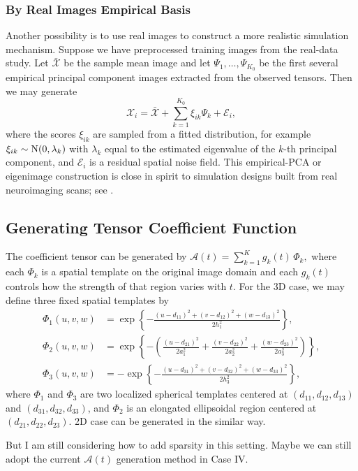 \documentclass[10pt]{notes}
\begin{document}
\subsubsection{By Real Images Empirical Basis}

Another possibility is to use real images to construct a more realistic
simulation mechanism. Suppose we have preprocessed training images from the
real-data study. Let $\bar{\mathcal{X}}$ be the sample mean image and let
$\Psi_1,\dots,\Psi_{K_0}$ be the first several empirical principal component
images extracted from the observed tensors. Then we may generate
\[
\mathcal{X}_i
=
\bar{\mathcal{X}}
+ \sum_{k=1}^{K_0} \xi_{ik}\Psi_k
+ \mathcal{E}_i,
\]
where the scores $\xi_{ik}$ are sampled from a fitted distribution, for
example $\xi_{ik}\sim \mathrm{N}(0,\lambda_k)$ with $\lambda_k$ equal to the
estimated eigenvalue of the $k$-th principal component, and
$\mathcal{E}_i$ is a residual spatial noise field. This empirical-PCA or
eigenimage construction is close in spirit to simulation designs built from
real neuroimaging scans; see \cite{goldsmith2014}.

\subsection{Generating Tensor Coefficient Function}
The coefficient tensor can be generated by
$
\mathcal{A}(t)
=
\sum_{k=1}^K g_k(t)\,\Phi_k,
$
where each $\Phi_k$ is a spatial template on the original image domain and
each $g_k(t)$ controls how the strength of that region varies with $t$. For the 3D case, we may define
three fixed spatial templates by
\begin{align*}
    \Phi_1(u,v,w)
    &= \exp\!\left\{
    -\frac{(u-d_{11})^2 + (v-d_{12})^2 + (w-d_{13})^2}{2h_1^2}
    \right\}, \\
    \Phi_2(u,v,w)
    &= \exp\!\left\{
    -\left(
    \frac{(u-d_{21})^2}{2a_1^2}
    + \frac{(v-d_{22})^2}{2a_2^2}
    + \frac{(w-d_{23})^2}{2a_3^2}
    \right)
    \right\}, \\
    \Phi_3(u,v,w)
    &= -\exp\!\left\{
    -\frac{(u-d_{31})^2 + (v-d_{32})^2 + (w-d_{33})^2}{2h_3^2}
    \right\},
\end{align*}
where $\Phi_1$ and $\Phi_3$ are two localized spherical templates centered at
$(d_{11},d_{12},d_{13})$ and $(d_{31},d_{32},d_{33})$, and $\Phi_2$ is an
elongated ellipsoidal region centered at $(d_{21},d_{22},d_{23})$. 2D case can be generated in the similar way.

But I am still considering how to add sparsity in this setting. Maybe we can still adopt the current $\mathcal{A}(t)$ generation method in Case IV.
\end{document}
